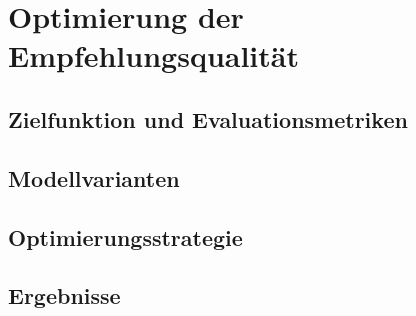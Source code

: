 \section{Optimierung der Empfehlungsqualität}

\subsection{Zielfunktion und Evaluationsmetriken}

\subsection{Modellvarianten}

\subsection{Optimierungsstrategie}

\subsection{Ergebnisse}
% 
% 
% 
% 
% 
% 
% 
% 
% 
% 
% 
% 